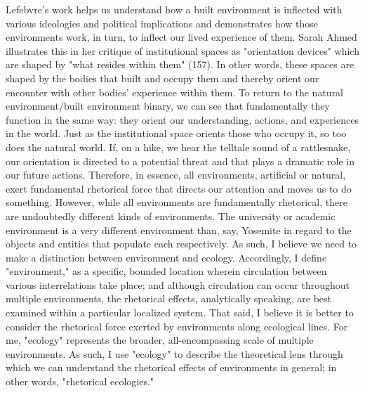 \documentclass{article}
\begin{document}
Lefebvre's work helps us understand how a built environment is inflected with various ideologies and political implications and demonstrates how those environments work, in turn, to inflect our lived experience of them. Sarah Ahmed illustrates this in her critique of institutional spaces as "orientation devices" which are shaped by "what resides within them" (157). In other words, these spaces are shaped by the bodies that built and occupy them and thereby orient our encounter with other bodies' experience within them. To return to the natural environment/built environment binary, we can see that fundamentally they function in the same way: they orient our understanding, actions, and experiences in the world. Just as the institutional space orients those who occupy it, so too does the natural world. If, on a hike, we hear the telltale sound of a rattlesnake, our orientation is directed to a potential threat and that plays a dramatic role in our future actions. Therefore, in essence, all environments, artificial or natural, exert fundamental rhetorical force that directs our attention and moves us to do something. However, while all environments are fundamentally rhetorical, there are undoubtedly different kinds of environments. The university or academic environment is a very different environment than, say, Yosemite in regard to the objects and entities that populate each respectively. As such, I believe we need to make a distinction between environment and ecology. Accordingly, I define "environment," as a specific, bounded location wherein circulation between various interrelations take place; and although circulation can occur throughout multiple environments, the rhetorical effects, analytically speaking, are best examined within a particular localized system. That said, I believe it is better to consider the rhetorical force exerted by environments along ecological lines. For me, "ecology" represents the broader, all-encompassing scale of multiple environments. As such, I use "ecology" to describe the theoretical lens through which we can understand the rhetorical effects of environments in general; in other words, "rhetorical ecologies."
\end{document}
